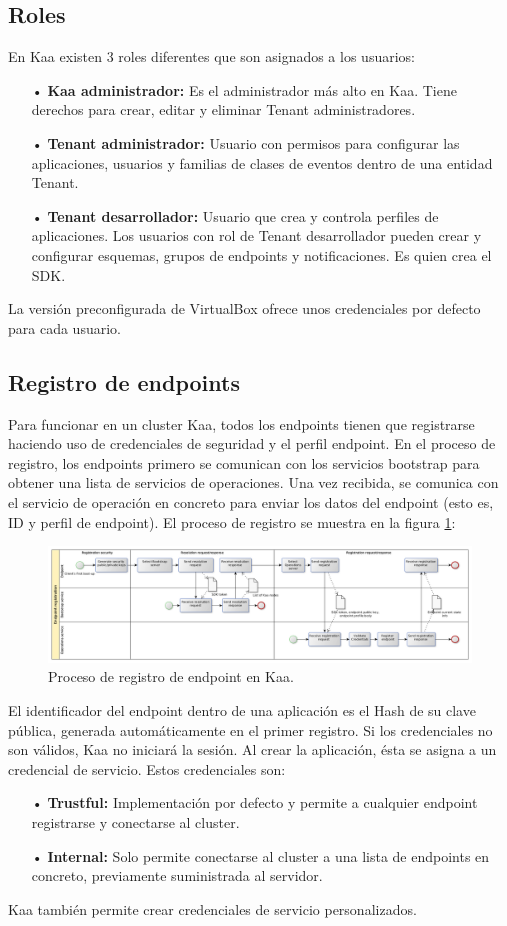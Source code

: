 \documentclass[12pt, twoside]{book}
\begin{document}
\subsection*{Roles}
En Kaa existen 3 roles diferentes que son asignados a los usuarios:
\begin{itemize}
\item[•] \textbf{Kaa administrador:} Es el administrador más alto en Kaa. Tiene derechos para crear, editar y eliminar Tenant administradores.
\item[•] \textbf{Tenant administrador:} Usuario con permisos para configurar las aplicaciones, usuarios y familias de clases de eventos dentro de una entidad Tenant.
\item[•] \textbf{Tenant desarrollador:} Usuario que crea y controla perfiles de aplicaciones. Los usuarios con rol de Tenant desarrollador pueden crear y configurar esquemas, grupos de endpoints y notificaciones. Es quien crea el SDK.
\end{itemize}
La versión preconfigurada de VirtualBox ofrece unos credenciales por defecto para cada usuario.
\subsection*{Registro de endpoints}
Para funcionar en un cluster Kaa, todos los endpoints tienen que registrarse haciendo uso de credenciales de seguridad y el perfil endpoint. En el proceso de registro, los endpoints primero se comunican con los servicios bootstrap para obtener una lista de servicios de operaciones. Una vez recibida, se comunica con el servicio de operación en concreto para enviar los datos del endpoint (esto es, ID y perfil de endpoint). El proceso de registro se muestra en la figura \ref{registration}:
\begin{figure}[H]
\centering
\includegraphics[scale=0.25]{images/registration}
\caption{Proceso de registro de endpoint en Kaa.}\label{registration}
\end{figure} 

El identificador del endpoint dentro de una aplicación es el Hash de su clave pública, generada automáticamente en el primer registro. Si los credenciales no son válidos, Kaa no iniciará la sesión. Al crear la aplicación, ésta se asigna a un credencial de servicio. Estos credenciales son:
\begin{itemize}
\item[•] \textbf{Trustful:} Implementación por defecto y permite a cualquier endpoint registrarse y conectarse al cluster. 
\item[•] \textbf{Internal:} Solo permite conectarse al cluster a una lista de endpoints en concreto, previamente suministrada al servidor. 
\end{itemize}
Kaa también permite crear credenciales de servicio personalizados.
\end{document}
